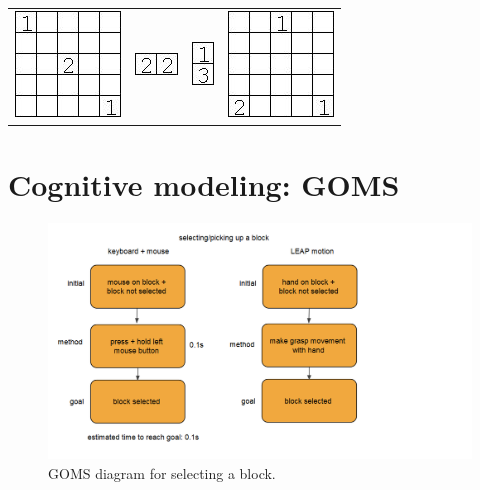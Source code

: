 \begin{appendix}
{\begin{tabular}{m{4cm}m{4cm}m{4cm}m{4cm}}
\centerline{\includegraphics{imgs/models/model17}}&\centerline{\includegraphics{imgs/models/model18}}&\centerline{\includegraphics{imgs/models/model19}}&\centerline{\includegraphics{imgs/models/model20}}
\end{tabular}}

\newpage
\section{Cognitive modeling: GOMS}
\begin{figure}[!htbp]
\includegraphics[width=\textwidth]{imgs/selectingblocks.png}
\caption{GOMS diagram for selecting a block.}
\label{fig:selectingblocks}
\end{figure}


\end{appendix}
